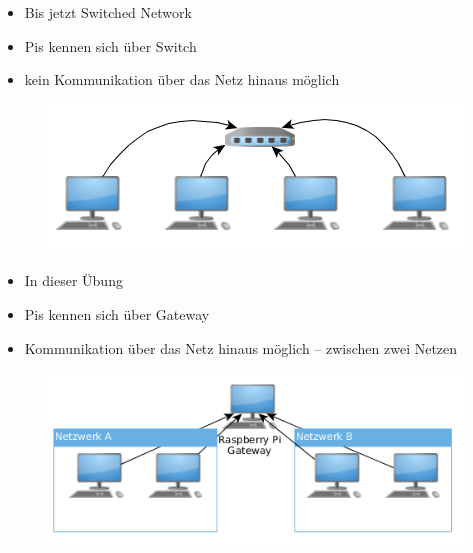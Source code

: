 \documentclass[xcolor=dvipsnames]{beamer}
\begin{document}
\begin{frame}
\hspace{-1cm}
\begin{minipage}{0.6\textwidth}
\begin{itemize}
	\item Bis jetzt Switched Network
	\item Pis kennen sich über Switch
	\item kein Kommunikation über das Netz hinaus möglich
\end{itemize}
\end{minipage}%
\begin{minipage}{0.4\textwidth}
\begin{figure}
\centering
\includegraphics[scale=0.4]{current}
\end{figure}
\end{minipage}
\end{frame}

\begin{frame}
\hspace{-1cm}
\begin{minipage}{0.6\textwidth}
\begin{itemize}
	\item In dieser Übung
	\item Pis kennen sich über Gateway
	\item Kommunikation über das Netz hinaus möglich -- zwischen zwei Netzen
\end{itemize}
\end{minipage}%
\begin{minipage}{0.4\textwidth}
\begin{figure}
\centering
\includegraphics[scale=0.35]{gateway}
\end{figure}
\end{minipage}
\end{frame}
\end{document}

